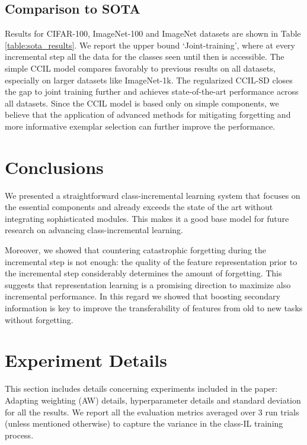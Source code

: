 \documentclass[final]{cvpr}
\newcommand{\ilkd}{CCIL }
\newcommand{\ilkdsd}{CCIL-SD }
\begin{document}
\subsection{Comparison to SOTA}
Results for CIFAR-100, ImageNet-100 and ImageNet datasets are shown in Table \ref{table:sota_results}. 
We report the upper bound `Joint-training', where at every incremental step all the data for the classes seen until then is accessible.
The simple \ilkd model compares favorably to previous results on all datasets, especially on larger datasets like ImageNet-1k. 
The regularized \ilkdsd closes the gap to joint training further and achieves state-of-the-art performance across all datasets. 
Since the \ilkd model is based only on simple components, we believe that the application of advanced methods for mitigating forgetting \cite{lucir, tpcil} and more informative exemplar selection \cite{mnemonics} can further improve the performance. 

 \section{Conclusions}








We presented a straightforward class-incremental learning system that focuses on the essential components and already exceeds the state of the art without integrating sophisticated modules. This makes it a good base model for future research on advancing class-incremental learning. 

Moreover, we showed that countering catastrophic forgetting during the incremental step is not enough: the quality of the feature representation prior to the incremental step considerably determines the amount of forgetting.
This suggests that representation learning is a promising direction to maximize also incremental performance.
In this regard we showed that boosting secondary information is key to improve the transferability of features from old to new tasks without forgetting.






%
 

\appendix

\section{Experiment Details}

 This section includes details concerning experiments included in the paper: Adapting weighting (AW) details, hyperparameter details and standard deviation for all the results. We report all the evaluation metrics averaged over 3 run trials (unless mentioned otherwise) to capture the variance in the class-IL training process.   
 
\end{document}
